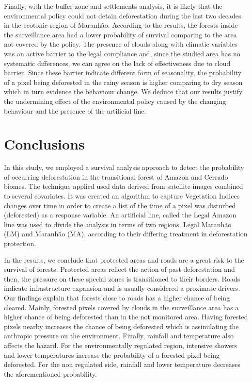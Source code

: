 Finally, with the buffer zone and settlements analysis, it is likely that the environmental policy could not detain deforestation during the last two decades in the ecotonic region of Maranhão. According to the results, the forests inside the surveillance area had a lower probability of survival comparing to the area not covered by the policy. The presence of clouds along with climatic variables was an active barrier to the legal compliance and, since the studied area has no systematic differences, we can agree on the lack of effectiveness due to cloud barrier. Since these barrier indicate different form of seasonality, the probability of a pixel being deforested in the rainy season is higher comparing to dry season which in turn evidence the behaviour change. We deduce that our results justify the undermining effect of the environmental policy caused by the changing behaviour and the presence of the artificial line. 

\section{Conclusions}
\label{S:6}

In this study, we employed a survival analysis approach to detect the probability of occurring deforestation in the transitional forest of Amazon and Cerrado biomes. The technique applied used data derived from satellite images combined to several covariates. It was created an algorithm to capture Vegetation Indices changes over time in order to create a list of the time of a pixel was disturbed (deforested) as a response variable. An artificial line, called the Legal Amazon line was used to divide the analysis in terms of two regions, Legal Maranhão (LM) and Maranhão (MA), according to their differing treatment in deforestation protection.  

In the results, we conclude that protected areas and roads are a great risk to the survival of forests. Protected areas reflect the action of past deforestation and then, the pressure on these special zones is transitioned to their borders. Roads indicate infrastructure expansion and is usually considered a proximate drivers. Our findings explain that forests close to roads has a higher chance of being cleared. Mainly, forested pixels covered by clouds in the surveillance area has a higher chance of being deforested than in the not monitored area. Having forested pixels nearby increases the chance of being deforested which is assimilating the anthropic pressure on the environment. Finally, rainfall and temperature also affects the hazard. For the environmentally regulated region, intensive showers and lower temperatures increase the probability of a forested pixel being deforested. For the non regulated side, rainfall and lower temperature decreases the aforementioned probability.

